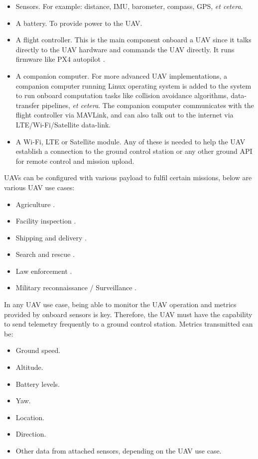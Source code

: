 \begin{itemize}
    \item Sensors.  For example: distance, IMU, barometer, compass, GPS, \textit{et cetera}.
    \item A battery. To provide power to the UAV.
    \item A flight controller. This is the main component onboard a UAV since it talks directly to the UAV hardware and commands the UAV directly. It runs firmware like PX4 autopilot \cite{px4documentation}.
    \item A companion computer. For more advanced UAV implementations, a companion computer running Linux operating system is added to the system to run onboard computation tasks like collision avoidance algorithms, data-transfer pipelines, \textit{et cetera}. The companion computer communicates with the flight controller via MAVLink, and can also talk out to the internet via LTE/Wi-Fi/Satellite data-link.
    \item A Wi-Fi, LTE or Satellite module. Any of these is needed to help the UAV establish a connection to the ground control station or any other ground API for remote control and mission upload.
\end{itemize}

UAVs can be configured with various payload to fulfil certain missions, below are various UAV use cases:
\begin{itemize}
    \item Agriculture \cite{djienterprisedonesinagriculture}.
    \item Facility inspection \cite{dronesinfacilityinspection}.
    \item Shipping and delivery \cite{insiderintelligence2022}.
    \item Search and rescue \cite{dronesinsearchandrescue}.
    \item Law enforcement \cite{djidronesinlawenforcement}.
    \item Military reconnaissance / Surveillance \cite{dwdronesinbundeswehr}.
\end{itemize}

In any UAV use case, being able to monitor the UAV operation and metrics provided by onboard sensors is key. Therefore, the UAV must have the capability to send telemetry frequently to a ground control station. Metrics transmitted can be:
\begin{itemize}
    \item Ground speed.
    \item Altitude.
    \item Battery levels.
    \item Yaw.
    \item Location.
    \item Direction.
    \item Other data from attached sensors, depending on the UAV use case.
\end{itemize}

